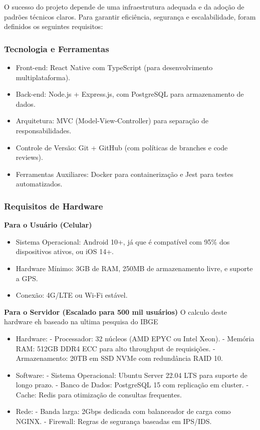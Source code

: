 \documentclass[a4paper, 12pt]{article}
\begin{document}
O sucesso do projeto depende de uma infraestrutura adequada e da adoção de padrões técnicos claros. Para garantir eficiência, segurança e escalabilidade, foram definidos os seguintes requisitos:

\subsubsection{Tecnologia e Ferramentas}
\begin{itemize}[]
\item Front-end: React Native com TypeScript (para desenvolvimento multiplataforma).
\item Back-end: Node.js + Express.js, com PostgreSQL para armazenamento de dados.
\item Arquitetura: MVC (Model-View-Controller) para separação de responsabilidades.
\item Controle de Versão: Git + GitHub (com políticas de branches e code reviews).
\item Ferramentas Auxiliares: Docker para containerização e Jest para testes automatizados.
\end{itemize}

\subsubsection{Requisitos de Hardware}

\textbf{Para o Usuário (Celular)}
\begin{itemize}[]
\item Sistema Operacional: Android 10+, já que é compatível com 95\% dos dispositivos ativos, ou iOS 14+.
\item Hardware Mínimo: 3GB de RAM, 250MB de armazenamento livre, e suporte a GPS.
\item Conexão: 4G/LTE ou Wi-Fi estável.
\end{itemize}

\textbf{Para o Servidor (Escalado para 500 mil usuários)}
O calculo deste hardware eh baseado na ultima pesquisa do IBGE \cite{ibge-2022}
\begin{itemize}[]
\item Hardware:
- Processador: 32 núcleos (AMD EPYC ou Intel Xeon).
- Memória RAM: 512GB DDR4 ECC para alto throughput de requisições.
- Armazenamento: 20TB em SSD NVMe com redundância RAID 10.
\item Software:
- Sistema Operacional: Ubuntu Server 22.04 LTS para suporte de longo prazo.
- Banco de Dados: PostgreSQL 15 com replicação em cluster.
- Cache: Redis para otimização de consultas frequentes.
\item Rede:
- Banda larga: 2Gbps dedicada com balanceador de carga como NGINX.
- Firewall: Regras de segurança baseadas em IPS/IDS.
\end{itemize}
\end{document}
